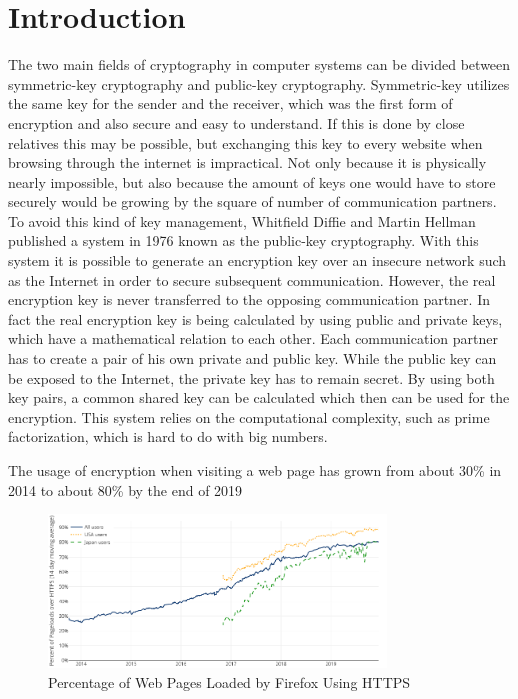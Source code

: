 \documentclass[12pt,oneside,a4paper,parskip]{scrbook}
\begin{document}
\mainmatter

\chapter{Introduction}\label{ch:intro}

The two main fields of cryptography in computer systems can be divided between symmetric-key cryptography and public-key cryptography. Symmetric-key utilizes the same key for the sender and the receiver, which was the first form of encryption and also secure and easy to understand. If this is done by close relatives this may be possible, but exchanging this key to every website when browsing through the internet is impractical. Not only because it is physically nearly impossible, but also because the amount of keys one would have to store securely would be growing by the square of number of communication partners.
To avoid this kind of key management, Whitfield Diffie and Martin Hellman published a system in 1976 known as the public-key cryptography. With this system it is possible to generate an encryption key over an insecure network such as the Internet in order to secure subsequent communication. However, the real encryption key is never transferred to the opposing communication partner. In fact the real encryption key is being calculated by using public and private keys, which have a mathematical relation to each other. Each communication partner has to create a pair of his own private and public key. While the public key can be exposed to the Internet, the private key has to remain secret. 
By using both key pairs, a common shared key can be calculated which then can be used for the encryption. This system relies on the computational complexity, such as prime factorization, which is hard to do with big numbers. 

The usage of encryption when visiting a web page has grown from about 30\% in 2014 to about 80\% by the end of 2019

\begin{figure}[ht]
	\centering
  \includegraphics[width=0.8\textwidth]{ressources/https_statistics.png}
	\caption{Percentage of Web Pages Loaded by Firefox Using HTTPS \parencite{letsencrypt_lets_2019}}
\end{figure}
\end{document}
